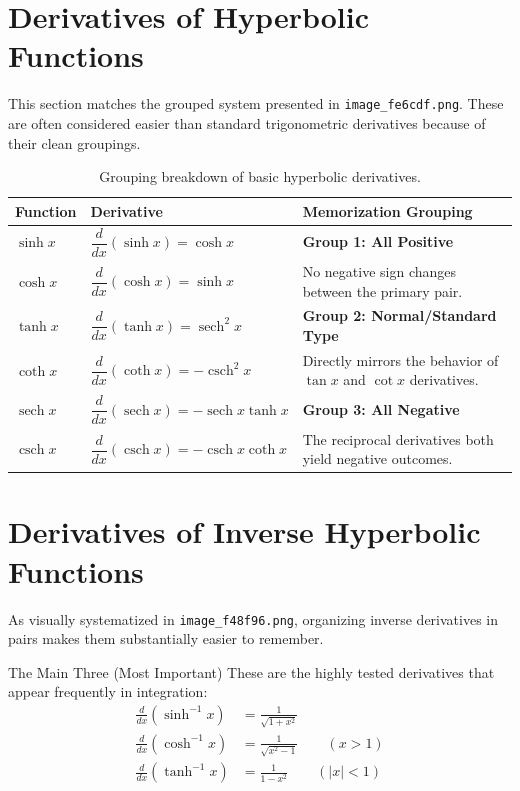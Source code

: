 \documentclass[11pt, a4paper]{article}
\DeclareMathOperator{\sech}{sech}
\DeclareMathOperator{\csch}{csch}
\begin{document}
\section{Derivatives of Hyperbolic Functions}
\label{sec:derivatives}
This section matches the grouped system presented in \texttt{image\_fe6cdf.png}. These are often considered easier than standard trigonometric derivatives because of their clean groupings.

\begin{table}[h!]
\centering
\renewcommand{\arraystretch}{1.8}
\begin{tabular}{llp{7cm}}
\toprule
\textbf{Function} & \textbf{Derivative} & \textbf{Memorization Grouping} \\
\midrule
$\sinh x$ & $\dfrac{d}{dx}(\sinh x) = \cosh x$ & \textbf{Group 1: All Positive} \\
$\cosh x$ & $\dfrac{d}{dx}(\cosh x) = \sinh x$ & No negative sign changes between the primary pair. \\
\midrule
$\tanh x$ & $\dfrac{d}{dx}(\tanh x) = \sech^2 x$ & \textbf{Group 2: Normal/Standard Type} \\
$\coth x$ & $\dfrac{d}{dx}(\coth x) = -\csch^2 x$ & Directly mirrors the behavior of $\tan x$ and $\cot x$ derivatives. \\
\midrule
$\sech x$ & $\dfrac{d}{dx}(\sech x) = -\sech x \tanh x$ & \textbf{Group 3: All Negative} \\
$\csch x$ & $\dfrac{d}{dx}(\csch x) = -\csch x \coth x$ & The reciprocal derivatives both yield negative outcomes. \\
\bottomrule
\end{tabular}
\caption{Grouping breakdown of basic hyperbolic derivatives.}
\end{table}

\newpage

\section{Derivatives of Inverse Hyperbolic Functions}
\label{sec:inverse_derivatives}
As visually systematized in \texttt{image\_f48f96.png}, organizing inverse derivatives in pairs makes them substantially easier to remember.

\begin{keyconcept}{The Main Three (Most Important)}
These are the highly tested derivatives that appear frequently in integration:
\begin{align*}
    \frac{d}{dx}\left(\sinh^{-1} x\right) &= \frac{1}{\sqrt{1 + x^2}} \\[8pt]
    \frac{d}{dx}\left(\cosh^{-1} x\right) &= \frac{1}{\sqrt{x^2 - 1}} \qquad (x > 1) \\[8pt]
    \frac{d}{dx}\left(\tanh^{-1} x\right) &= \frac{1}{1 - x^2} \qquad (|x| < 1)
\end{align*}
\end{keyconcept}
\end{document}
